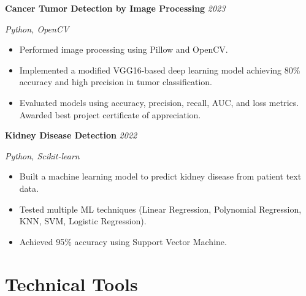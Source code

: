 \documentclass[a4paper,11pt]{article}
\newcommand{\cvproject}[2]{%
  \textbf{#1} \hfill \textit{#2}
  \vspace{2pt}
}
\begin{document}
\vspace{6pt}

\cvproject{Cancer Tumor Detection by Image Processing}{2023}
\newline \textit{Python, OpenCV}
\begin{itemize}[leftmargin=1.5em, topsep=2pt, itemsep=-5pt]
  \item Performed image processing using Pillow and OpenCV.
  \item Implemented a modified VGG16-based deep learning model achieving 80\% accuracy and high precision in tumor classification.
  \item Evaluated models using accuracy, precision, recall, AUC, and loss metrics. Awarded best project certificate of appreciation.
\end{itemize}

\vspace{6pt}

\cvproject{Kidney Disease Detection}{2022}
\newline \textit{Python, Scikit-learn}
\begin{itemize}[leftmargin=1.5em, topsep=2pt, itemsep=-5pt]
  \item Built a machine learning model to predict kidney disease from patient text data.
  \item Tested multiple ML techniques (Linear Regression, Polynomial Regression, KNN, SVM, Logistic Regression).
  \item Achieved 95\% accuracy using Support Vector Machine.
\end{itemize}




\section{Technical Tools}
\end{document}
